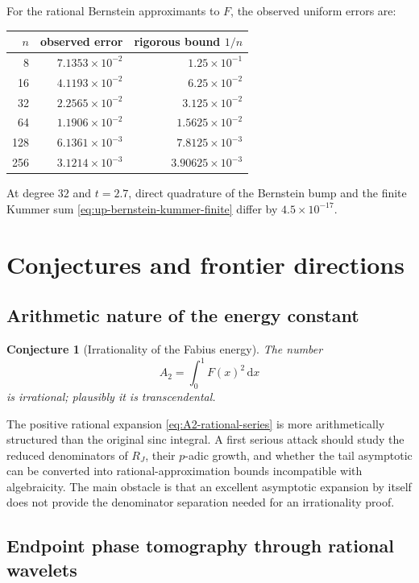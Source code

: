 \documentclass[11pt,oneside]{article}
\newtheorem{conjecture}[theorem]{Conjecture}
\theoremstyle{definition}
\theoremstyle{remark}
\newcommand{\dd}{\,\mathrm d}
\newcommand{\1}{\mathbf 1}
\begin{document}
For the rational Bernstein approximants to $F$, the observed uniform errors
are:
\begin{center}
\begin{tabular}{@{}rrr@{}}
\toprule
$n$ & observed error & rigorous bound $1/n$\\
\midrule
8   & $7.1353\times10^{-2}$ & $1.25\times10^{-1}$\\
16  & $4.1193\times10^{-2}$ & $6.25\times10^{-2}$\\
32  & $2.2565\times10^{-2}$ & $3.125\times10^{-2}$\\
64  & $1.1906\times10^{-2}$ & $1.5625\times10^{-2}$\\
128 & $6.1361\times10^{-3}$ & $7.8125\times10^{-3}$\\
256 & $3.1214\times10^{-3}$ & $3.90625\times10^{-3}$\\
\bottomrule
\end{tabular}
\end{center}
At degree $32$ and $t=2.7$, direct quadrature of the Bernstein bump and the
finite Kummer sum \eqref{eq:up-bernstein-kummer-finite} differ by
$4.5\times10^{-17}$.

\section{Conjectures and frontier directions}
\label{sec:frontier}

\subsection{Arithmetic nature of the energy constant}

\begin{conjecture}[Irrationality of the Fabius energy]
\label{conj:A2-irrational}
The number
\[
 A_2=\int_0^1F(x)^2\dd x
\]
is irrational; plausibly it is transcendental.
\end{conjecture}

The positive rational expansion \eqref{eq:A2-rational-series} is more
arithmetically structured than the original sinc integral.  A first serious
attack should study the reduced denominators of $R_J$, their $p$-adic growth,
and whether the tail asymptotic can be converted into rational-approximation
bounds incompatible with algebraicity.  The main obstacle is that an
excellent asymptotic expansion by itself does not provide the denominator
separation needed for an irrationality proof.

\subsection{Endpoint phase tomography through rational wavelets}
\end{document}
